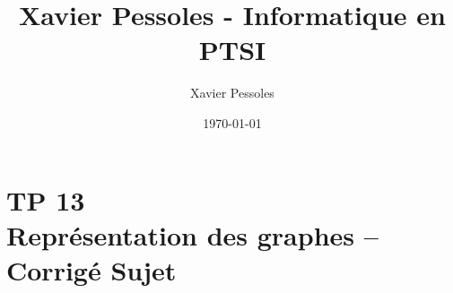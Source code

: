 \documentclass[
	fontsize=10pt, %
	twoside=true, %
]{kaobook}
\newcommand{\repRel}{../../../..}
\newcommand{\repStyle}{\repRel/Style}
\begin{document}

\titlehead{Xavier Pessoles - Informatique en PTSI}
\title[Xavier Pessoles - Informatique en PTSI]{Xavier Pessoles - Informatique en PTSI}
\author[XP]{Xavier Pessoles}
\date{\today}


\begingroup %
\endgroup

%
\mainmatter %
%
%
%
%


\setcounter{margintocdepth}{\sectiontocdepth}
\marginlayout
\graphicspath{{\repStyle/png}}

\pagestyle{xp.scrheadings}


%



\newcommand{\repExo}{}
\newcommand{\nomExo}{}

\livrettrue %
\livrettrue
\colletrue



\chapter*{TP 13 \\ 
Représentation des graphes -- \ifprof Corrigé \else Sujet \fi}
\end{document}

